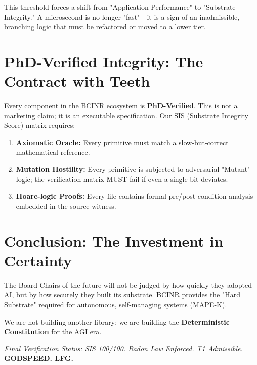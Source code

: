 \documentclass[11pt,a4paper]{article}
\begin{document}
This threshold forces a shift from "Application Performance" to "Substrate Integrity." A microsecond is no longer "fast"---it is a sign of an inadmissible, branching logic that must be refactored or moved to a lower tier.

\section{PhD-Verified Integrity: The Contract with Teeth}
Every component in the BCINR ecosystem is \textbf{PhD-Verified}. This is not a marketing claim; it is an executable specification. Our SIS (Substrate Integrity Score) matrix requires:
\begin{enumerate}
    \item \textbf{Axiomatic Oracle:} Every primitive must match a slow-but-correct mathematical reference.
    \item \textbf{Mutation Hostility:} Every primitive is subjected to adversarial "Mutant" logic; the verification matrix MUST fail if even a single bit deviates.
    \item \textbf{Hoare-logic Proofs:} Every file contains formal pre/post-condition analysis embedded in the source witness.
\end{enumerate}

\section{Conclusion: The Investment in Certainty}
The Board Chairs of the future will not be judged by how quickly they adopted AI, but by how securely they built its substrate. BCINR provides the "Hard Substrate" required for autonomous, self-managing systems (MAPE-K). 

We are not building another library; we are building the \textbf{Deterministic Constitution} for the AGI era.

\vspace{2cm}
\noindent \textit{Final Verification Status: SIS 100/100. Radon Law Enforced. T1 Admissible.} \\
\textbf{GODSPEED. LFG.}
\end{document}
